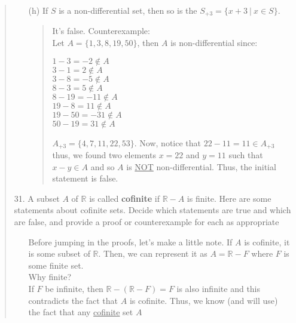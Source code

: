 \documentclass[12pt, a4paper]{article}                      %
\begin{document}
\begin{enumerate}
\begin{quote}
\begin{itemize}
If $S$ is non-differential, so is $\mathbb{Z} - S$.
\begin{quote}
It's false. Counterexample:\\
Let $A = \{1, 3\}$. $A$ is non-differential since $1 - 3 = -2 \notin A$ and $3 - 1 = 2 \notin A$.
Then we know that $Z - A$ would include numbers $7,8,15$. But $15 - 8 = 7 \in Z - A$ which is not
non-differential.
\end{quote}
\item[(h)]
If $S$ is a non-differential set, then so is the $S_{+3} = \{x + 3 \ | \ x \in S\}$.
\begin{quote}
It's false. Counterexample:\\
Let $A = \{1, 3, 8, 19, 50\}$, then $A$ is non-differential since:
\begin{center}
$1 - 3 = -2 \notin A$\\
$3 - 1 = 2 \notin A$\\
$3 - 8 = -5 \notin A$\\
$8 - 3 = 5 \notin A$\\
$8 - 19 = -11 \notin A$\\
$19 - 8 = 11 \notin A$\\
$19 - 50 = -31 \notin A$\\
$50 - 19 = 31 \notin A$\\
\end{center}
$A_{+3} = \{4, 7, 11, 22, 53\}$. Now, notice that $22 - 11 = 11 \in A_{+3}$ thus, we found
two elements $x = 22$ and $y = 11$ such that $x - y \in A$ and so $A$ is \underline{NOT} non-differential.
Thus, the initial statement is false.
\end{quote}
\end{itemize}
\item[31.]
A subset $A$ of $\mathbb{R}$ is called \textbf{cofinite} if $\mathbb{R} - A$ is finite. Here are some statements about
cofinite sets. Decide which statements are true and which are false, and provide a proof
or counterexample for each as appropriate
\begin{itemize}
\item[]
Before jumping in the proofs, let's make a little note.
If $A$ is cofinite, it is some subset of $\mathbb{R}$.
Then, we can represent it as $A = \mathbb{R} - F$
where $F$ is some finite set.\\
Why finite?\\
If $F$ be infinite, then $\mathbb{R} - (\mathbb{R} - F) = F$ is also
infinite and this contradicts the fact that $A$ is cofinite.
Thus, we know (and will use) the fact that any \underline{cofinite} set $A$

\end{itemize}
\end{quote}
\end{enumerate}
\end{document}
